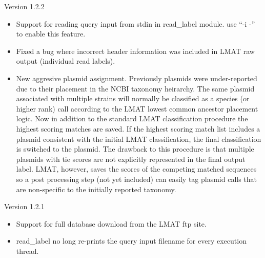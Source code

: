 \documentclass[11pt]{article}
\begin{document}
Version 1.2.2
\begin{itemize} 
\item
Support for reading query input from stdin in read\_label module.  use ``-i -'' to enable this feature.
\item
Fixed a bug where incorrect header information was included in LMAT raw output (individual read labels).
\item New aggresive plasmid assignment.  Previously plasmids were under-reported due to their placement in the NCBI taxonomy heirarchy. The same plasmid associated with multiple strains will normally be classified as a species (or higher rank) call according to the LMAT lowest common ancestor placement logic. Now in addition to the standard LMAT classification procedure the highest scoring matches are saved.  If the highest scoring match list includes a plasmid consistent with the initial LMAT classification, the final classification is switched to the plasmid.  The drawback
to this procedure is that multiple plasmids with tie scores are not explicitly represented in the final output label. LMAT, however, saves the scores of the competing matched sequences so a post processing step (not yet included) can easily tag plasmid calls that are non-specific to the initially reported taxonomy. \end{itemize}


Version 1.2.1
\begin{itemize}
\item
Support for full database download from the LMAT ftp site.
\item
read\_label no long re-prints the query input filename for every execution thread.
\end{itemize}
\end{document}
